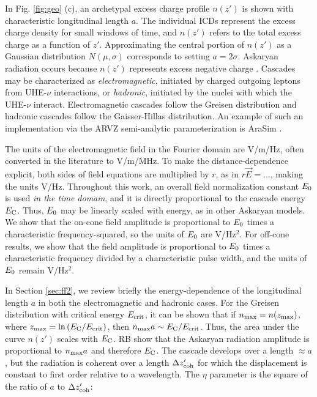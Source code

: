 \documentclass[amsmath,amssymb,aps,prd,10pt,twocolumn]{revtex4}
\begin{document}
In Fig. \ref{fig:geo} (c), an archetypal excess charge profile $n(z')$ is shown with characteristic longitudinal length $a$.  The individual ICDs represent the excess charge density for small windows of time, and $n(z')$ refers to the total excess charge as a function of $z'$.  Approximating the central portion of $n(z')$ as a Gaussian distribution $N(\mu,\sigma)$ corresponds to setting $a = 2 \sigma$.  Askaryan radiation occurs because $n(z')$ represents excess negative charge \cite{zhs,PhysRevD.65.103002,10.1016/j.astropartphys.2017.03.008}.  Cascades may be characterized as \textit{electromagnetic}, initiated by charged outgoing leptons from UHE-$\nu$ interactions, or \textit{hadronic}, initiated by the nuclei with which the UHE-$\nu$ interact.  Electromagnetic cascades follow the Greisen distribution and hadronic cascades follow the Gaisser-Hillas distribution.  An example of such an implementation via the ARVZ semi-analytic parameterization is AraSim \cite{10.1016/j.astropartphys.2011.11.010}.

The units of the electromagnetic field in the Fourier domain are V/m/Hz, often converted in the literature to V/m/MHz. To make the distance-dependence explicit, both sides of field equations are multiplied by $r$, as in $r\vec{E} = ... $, making the units V/Hz. Throughout this work, an overall field normalization constant $E_{\rm 0}$ is used \textit{in the time domain}, and it is directly proportional to the cascade energy $E_{\rm C}$. Thus, $E_{\rm 0}$ may be linearly scaled with energy, as in other Askaryan models.  We show that the on-cone field amplitude is proportional to $E_{\rm 0}$ times a characteristic frequency-squared, so the units of $E_{\rm 0}$ are V/Hz$^2$.  For off-cone results, we show that the field amplitude is proportional to $E_{\rm 0}$ times a characteristic frequency divided by a characteristic pulse width, and the units of $E_{\rm 0}$ remain V/Hz$^2$.

In Section \ref{sec:ff2}, we review briefly the energy-dependence of the longitudinal length $a$ in both the electromagnetic and hadronic cases.  For the Greisen distribution with critical energy $E_{\rm crit}$, it can be shown that if $n_{\rm max} = n(z_{\rm max})$, where $z_{\rm max} = \ln{(E_{\rm C}/E_{\rm crit})}$, then $n_{\rm max} a \sim E_{\rm C}/E_{\rm crit}$.  Thus, the area under the curve $n(z')$ scales with $E_{\rm C}$.  RB show that the Askaryan radiation amplitude is proportional to $n_{\rm max} a$ and therefore $E_{\rm C}$.  The cascade develops over a length $\approx a$, but the radiation is coherent over a length $\Delta z'_{\rm coh}$ for which the displacement is constant to first order relative to a wavelength.  The $\eta$ parameter is the square of the ratio of $a$ to $\Delta z'_{\rm coh}$:
\end{document}
